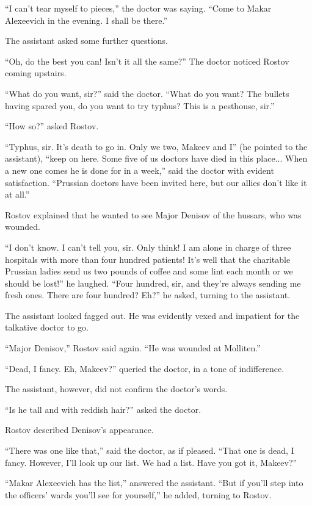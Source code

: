 ``I can't tear myself to pieces,'' the doctor was saying. ``Come
to Makar Alexeevich in the evening. I shall be there.''

The assistant asked some further questions.

``Oh, do the best you can! Isn't it all the same?'' The doctor
noticed Rostov coming upstairs.

``What do you want, sir?'' said the doctor. ``What do you want?
The bullets having spared you, do you want to try typhus? This is
a pesthouse, sir.''

``How so?'' asked Rostov.

``Typhus, sir. It's death to go in. Only we two, Makeev and I''
(he pointed to the assistant), ``keep on here. Some five of us
doctors have died in this place... When a new one comes he is
done for in a week,'' said the doctor with evident
satisfaction. ``Prussian doctors have been invited here, but our
allies don't like it at all.''

Rostov explained that he wanted to see Major Denisov of the
hussars, who was wounded.

``I don't know. I can't tell you, sir. Only think! I am alone in
charge of three hospitals with more than four hundred patients!
It's well that the charitable Prussian ladies send us two pounds
of coffee and some lint each month or we should be lost!'' he
laughed. ``Four hundred, sir, and they're always sending me fresh
ones. There are four hundred? Eh?''  he asked, turning to the
assistant.

The assistant looked fagged out. He was evidently vexed and
impatient for the talkative doctor to go.

``Major Denisov,'' Rostov said again. ``He was wounded at
Molliten.''

``Dead, I fancy. Eh, Makeev?'' queried the doctor, in a tone of
indifference.

The assistant, however, did not confirm the doctor's words.

``Is he tall and with reddish hair?'' asked the doctor.

Rostov described Denisov's appearance.

``There was one like that,'' said the doctor, as if
pleased. ``That one is dead, I fancy. However, I'll look up our
list. We had a list. Have you got it, Makeev?''

``Makar Alexeevich has the list,'' answered the assistant. ``But
if you'll step into the officers' wards you'll see for
yourself,'' he added, turning to Rostov.

